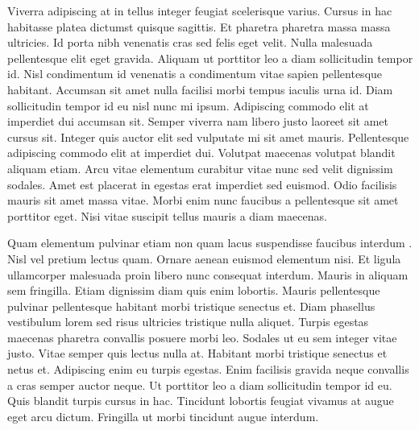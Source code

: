 \documentclass{article}
\begin{document}
Viverra adipiscing at in tellus integer feugiat scelerisque varius. Cursus in hac habitasse platea dictumst quisque sagittis. Et pharetra pharetra massa massa ultricies. Id porta nibh venenatis cras sed felis eget velit. Nulla malesuada pellentesque elit eget gravida. Aliquam ut porttitor leo a diam sollicitudin tempor id. Nisl condimentum id venenatis a condimentum vitae sapien pellentesque habitant. Accumsan sit amet nulla facilisi morbi tempus iaculis urna id. Diam sollicitudin tempor id eu nisl nunc mi ipsum. Adipiscing commodo elit at imperdiet dui accumsan sit. Semper viverra nam libero justo laoreet sit amet cursus sit. Integer quis auctor elit sed vulputate mi sit amet mauris. Pellentesque adipiscing commodo elit at imperdiet dui. Volutpat maecenas volutpat blandit aliquam etiam. Arcu vitae elementum curabitur vitae nunc sed velit dignissim sodales. Amet est placerat in egestas erat imperdiet sed euismod. Odio facilisis mauris sit amet massa vitae. Morbi enim nunc faucibus a pellentesque sit amet porttitor eget. Nisi vitae suscipit tellus mauris a diam maecenas.

Quam elementum pulvinar etiam non quam lacus suspendisse faucibus interdum \citep{Lorem2020a}. Nisl vel pretium lectus quam. Ornare aenean euismod elementum nisi. Et ligula ullamcorper malesuada proin libero nunc consequat interdum. Mauris in aliquam sem fringilla. Etiam dignissim diam quis enim lobortis. Mauris pellentesque pulvinar pellentesque habitant morbi tristique senectus et. Diam phasellus vestibulum lorem sed risus ultricies tristique nulla aliquet. Turpis egestas maecenas pharetra convallis posuere morbi leo. Sodales ut eu sem integer vitae justo. Vitae semper quis lectus nulla at. Habitant morbi tristique senectus et netus et. Adipiscing enim eu turpis egestas. Enim facilisis gravida neque convallis a cras semper auctor neque. Ut porttitor leo a diam sollicitudin tempor id eu. Quis blandit turpis cursus in hac. Tincidunt lobortis feugiat vivamus at augue eget arcu dictum. Fringilla ut morbi tincidunt augue interdum.


\end{document}
